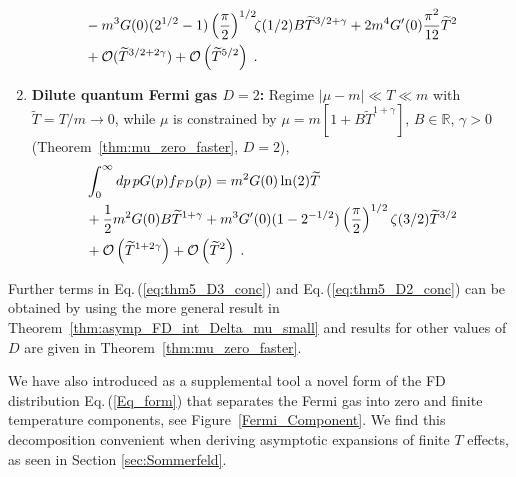 \documentclass[sn-mathphys,Numbered]{sn-jnl}
\newcommand{\req}[1]{Eq.\,(\ref{#1})}
\newcommand{\rf}[1]{Figure~{\ref{#1}}}
\newcommand*{\xred}{\color{black}}
\newcommand{\rTh}[1]{Theorem~{\ref{#1}}}
\begin{document}
\begin{enumerate}
\begin{align}
 &- m^{3}G(0)({2}^{1/2}-1)\left(\frac{\pi}{2}\right)^{1/2}\!\!\zeta(1/2)B\widetilde{T}^{3/2+\gamma} +2m^{4}G^\prime(0) \frac{\pi^2}{12}\widetilde{T}^{2}\notag\\
 &+\mathcal{O}(\widetilde{T}^{3/2+2\gamma})+ \mathcal{O}\left(\widetilde{T}^{5/2}\right)\;. \notag
\end{align} 
\item 
{\bf Dilute quantum Fermi gas $D=2$:} Regime $|\mu-m|\ll T\ll m$ with $\widetilde{T}=T/m\to 0$, while $\mu$ is constrained by $\mu=m[1+B\widetilde{T}^{1+\gamma}]$, $B\in\mathbb{R}$, $\gamma>0$ (\rTh{thm:mu_zero_faster}, $D=2$),
\begin{align}
&\int_0^\infty dp\, p G(p) f_{FD}(p)=m^{2}G(0)\ln(2)\widetilde{T} \label{eq:thm5_D2_conc}\\
 &+\frac{1}{2}m^{2}G(0)B\widetilde{T}^{1+\gamma}+m^{3}G^\prime(0)(1 - 2^{-1/2}) \left(\frac{\pi}{2}\right)^{1/2} \zeta(3/2)\widetilde{T}^{3/2}\notag\\
 &+\mathcal{O}\left(\widetilde{T}^{1+2\gamma}\right)+\mathcal{O}\left(\widetilde{T}^{2}\right)\;.\notag
\end{align} 
\end{enumerate}
Further terms in \req{eq:thm5_D3_conc} and \req{eq:thm5_D2_conc} can be obtained by using the more general result in \rTh{thm:asymp_FD_int_Delta_mu_small} {\xred and results for other values of $D$ are given in \rTh{thm:mu_zero_faster}. }

We have also introduced as a supplemental tool a novel form of the FD distribution \req{Eq_form} that separates the Fermi gas into zero and finite temperature components, see \rf{Fermi_Component}. We find this decomposition convenient when deriving asymptotic expansions of finite $T$ effects, as seen in Section \ref{sec:Sommerfeld}.%
\end{document}
